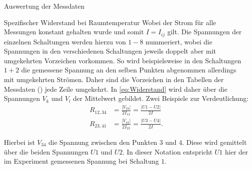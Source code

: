 \documentclass[pdftex, a4paper,11pt, twoside, ngerman]{report}
\begin{document}
\begin{chapter}{Auswertung der Messdaten}
\begin{section}{Spezifischer Widerstand bei Raumtemperatur}
      Wobei der Strom für alle Messungen konstant gehalten wurde und somit
      $I=I_{ij}$ gilt.
      Die Spannungen der einzelnen Schaltungen werden hierzu von $1-8$
      nummeriert, wobei die Spannungen in den verschiedenen Schaltungen jeweils
      doppelt aber mit umgekehrten Vorzeichen vorkommen.
      So wird beispielsweise in den Schaltungen $1+2$ die gemessene Spannung an
      den selben Punkten abgenommen allerdings mit umgekehrten Strömen.
      Daher sind die Vorzeichen in den Tabellen der Messdaten
      () jede Zeile umgekehrt.
      In \cref{eq:Widerstand} wird daher über die Spannungen $V_{k}$ und $V_{l}$
      der Mittelwert gebildet.
      Zwei Beispiele zur Verdeutlichung:
      \begin{align}
        R_{12,34} &= \frac{|V_{34}|}{2I_{12}} = \frac{|U1-U2|}{2I} \\
        R_{23,41} &= \frac{|V_{41}|}{2I_{23}} = \frac{|U3-U4|}{2I}.
      \end{align}

      Hierbei ist $V_{34}$ die Spannung zwischen den Punkten $3$ und $4$.
      Diese wird gemittelt über die beiden Spannungen $U1$ und $U2$.
      In dieser Notation entspricht $U1$ hier der im Experiment gemessenen
      Spannung bei Schaltung $1$.
      

\end{section}
\end{chapter}
\end{document}
